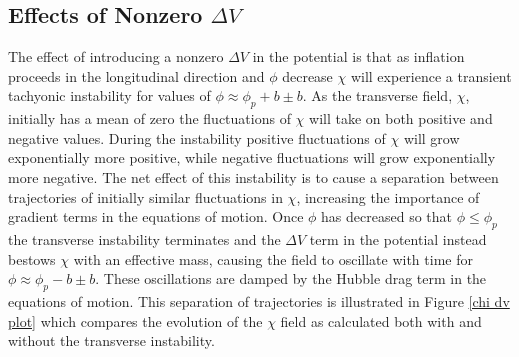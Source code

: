 \documentclass[letterpaper,11pt]{article}
\begin{document}


\subsection{Effects of Nonzero $\Delta V$}
The effect of introducing a nonzero $\Delta V$ in the potential is that as inflation proceeds in the longitudinal direction and $\phi$ decrease $\chi$ will experience a transient tachyonic instability for values of $\phi \approx \phi_p+b \pm b$. As the transverse field, $\chi$, initially has a mean of zero the fluctuations of $\chi$ will take on both positive and negative values. During the instability positive fluctuations of $\chi$ will grow exponentially more positive, while negative fluctuations will grow exponentially more negative. The net effect of this instability is to cause a separation between trajectories of initially similar fluctuations in $\chi$, increasing the importance of gradient terms in the equations of motion. Once $\phi$ has decreased so that $\phi \leq \phi_p$ the transverse instability terminates and the $\Delta V$ term in the potential instead bestows $\chi$ with an effective mass, causing the field to oscillate with time for $\phi \approx \phi_p-b \pm b$. These oscillations are damped by the Hubble drag term in the equations of motion. This separation of trajectories is illustrated in Figure \ref{chi dv plot} which compares the evolution of the $\chi$ field as calculated both with and without the transverse instability.
\end{document}
